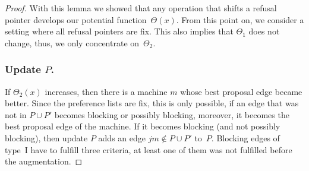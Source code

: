 \documentclass{llncs}
\begin{document}
\begin{proof}
With this lemma we showed that any operation that shifts a refusal pointer develops our potential function~$\Theta(x)$. From this point on, we consider a setting where all refusal pointers are fix. This also implies that $\Theta_1$ does not change, thus, we only concentrate on~$\Theta_2$.

\subsubsection*{Update $P$.}

If $\Theta_2(x)$ increases, then there is a machine $m$ whose best proposal edge became better. Since the preference lists are fix, this is only possible, if an edge that was not in $P \cup P'$ becomes blocking or possibly blocking, moreover, it becomes the best proposal edge of the machine. If it becomes blocking (and not possibly blocking), then update $P$ adds an edge $jm \notin P \cup P'$ to~$P$. Blocking edges of type~I have to fulfill three criteria, at least one of them was not fulfilled before the augmentation.


\end{proof}
\end{document}
